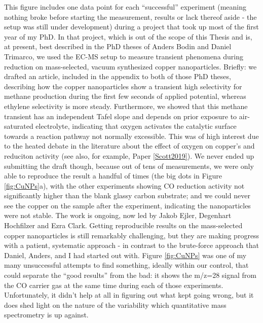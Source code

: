 This figure includes one data point for each ``successful'' experiment (meaning nothing broke before starting the measurement, results or lack thereof aside - the setup was still under development) during a project that took up most of the first year of my PhD. In that project, which is out of the scope of this Thesis and is, at present, best described in the PhD theses of Anders Bodin\cite{Bodin2017_PhD} and Daniel Trimarco\cite{Trimarco2017_PhD}, we used the EC-MS setup to measure transient phenomena during  reduction on mass-selected, vacuum synthesized copper nanoparticles. Briefly: we drafted an article, included in the appendix to both of those PhD theses, describing how the copper nanoparticles show a transient high selectivity for methane production during the first few seconds of applied potential, whereas ethylene selectivity is more steady. Furthermore, we showed that this methane transient has an independent Tafel slope and depends on prior exposure to air-saturated electrolyte, indicating that oxygen activates the catalytic surface towards a reaction pathway not normally excessible. This was of high interest due to the heated debate in the literature about the effect of oxygen on copper's  and  reduciton activity\cite{Mistry2016, Gao2017a, Eilert2017, Nitopi2019} (see also, for example, Paper \ref{Scott2019}). We never ended up submitting the draft though, because out of tens of measurements, we were only able to reproduce the result a handful of times (the big dots in Figure \ref{fig:CuNPs}a), with the other experiments showing CO reduction activity not significantly higher than the blank glassy carbon substrate; and we could never see the copper on the sample after the experiment, indicating the nanoparticles were not stable. The work is ongoing, now led by Jakob Ejler, Degenhart Hochfilzer and Ezra Clark. Getting reproducible results on the mass-selected copper nanoparticles is still remarkably challenging, but they are making progress with a patient, systematic approach - in contrast to the brute-force approach that Daniel, Anders, and I had started out with. Figure \ref{fig:CuNPs} was one of my many unsuccessful attempts to find something, ideally within our control, that could separate the ``good results'' from the bad: it shows the m/z=28 signal from the CO carrier gas at the same time during each of those experiments. Unfortunately, it didn't help at all in figuring out what kept going wrong, but it does shed light on the nature of the variability which quantitative mass spectrometry is up against.

